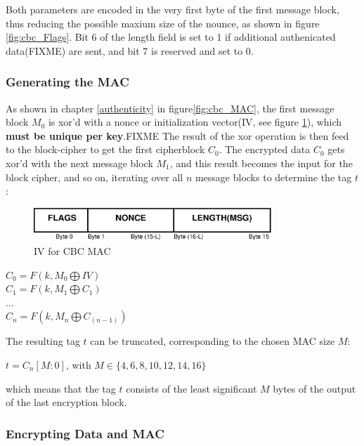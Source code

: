 Both parameters are encoded in the very first byte of the first message block, thus reducing the possible maxium size of the nounce, as shown in figure \ref{fig:cbc_Flags}.
Bit 6 of the length field is set to 1 if additional authenicated data(FIXME) are sent, and bit 7 is reserved and set to 0.


\subsubsection{Generating the MAC}

As shown in chapter \ref{authenticity} in figure\ref{fig:cbc_MAC}, the first message block $M_0$ is \gls{xor}'d with a nonce or initialization vector(IV, see figure
\ref{fig:ccrMacIV}), which \textbf{must be unique per key}.FIXME
The result of the \gls{xor} operation is then feed to the block-cipher to get the first cipherblock $C_0$. The encrypted data $C_0$ gets \gls{xor}'d with the next message block $M_1$, and this
result becomes the input for the block cipher, and so on, iterating over all $n$ message blocks to determine the tag $t$:

\begin{figure}
    \centering
    \includegraphics[width=0.8\textwidth]{figures/CCMCBCIV.eps}
    \caption{IV for CBC MAC}
    \label{fig:ccrMacIV}
\end{figure}


\begin{center}
 $C_0 = F(k, M_0 \bigoplus IV )$
 \\
 $C_1 = F(k, M_1 \bigoplus C_1) $
 \\
 $...$
 \\
 $C_n = F(k, M_n \bigoplus C_{(n-1)})$
 \\
\end{center}

The resulting tag $t$ can be truncated, corresponding to the chosen MAC size $M$:
\begin{center}
  $t = C_n[M:0]$, with $M \in \{4, 6, 8, 10, 12, 14, 16\}$
\end{center}
which means that the tag $t$ consists of the least significant $M$ bytes of the output of the last encryption block.

\subsubsection{Encrypting Data and MAC}

